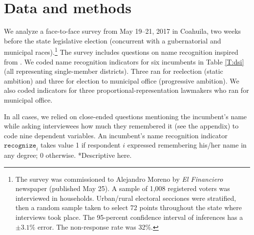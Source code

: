 \documentclass[letter,12pt]{article}
\begin{document}

\section{Data and methods}

We analyze a face-to-face survey from May 19--21, 2017 in Coahuila, two weeks before the state legislative election (concurrent with a gubernatorial and municipal races).\footnote{The survey was commissioned to Alejandro Moreno by \emph{El Financiero} newspaper (published May 25). A sample of 1,008 registered voters was interviewed in households. Urban/rural electoral secciones were stratified, then a random sample taken to select 72 points throughout the state where interviews took place. The 95-percent confidence interval of inferences has a $\pm3.1\%$ error. The non-response rate was 32\%.} The survey includes questions on name recognition inspired from \citet{cain.etal.1987}. We coded name recognition indicators for six incumbents in Table \ref{T:dsi} (all representing single-member districts). Three ran for reelection (static ambition) and three for election to municipal office (progressive ambition). We also coded indicators for three proportional-representation lawmakers who ran for municipal office. 


In all cases, we relied on close-ended questions mentioning the incumbent's name while asking interviewees how much they remembered it (see the appendix) to code nine dependent variables. An incumbent's name recognition indicator $\texttt{recognize}_i$ takes value 1 if respondent $i$ expressed remembering his/her name in any degree; 0 otherwise. *Descriptive here.
\end{document}
